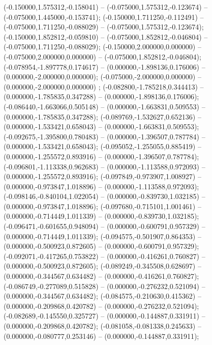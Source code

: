  (-0.150000,1.575312,-0.158041) -- (-0.075000,1.575312,-0.123674) -- (-0.075000,1.445000,-0.153741);
 (-0.150000,1.711250,-0.112491) -- (-0.075000,1.711250,-0.088029) -- (-0.075000,1.575312,-0.123674);
 (-0.150000,1.852812,-0.059810) -- (-0.075000,1.852812,-0.046804) -- (-0.075000,1.711250,-0.088029);
 (-0.150000,2.000000,0.000000) -- (-0.075000,2.000000,0.000000) -- (-0.075000,1.852812,-0.046804);
 (-0.078954,-1.897778,0.174617) -- (0.000000,-1.898136,0.176006) -- (0.000000,-2.000000,0.000000);
 (-0.075000,-2.000000,0.000000) -- (0.000000,-2.000000,0.000000) ;
 (-0.082800,-1.785218,0.344413) -- (0.000000,-1.785835,0.347288) -- (0.000000,-1.898136,0.176006);
 (-0.086440,-1.663066,0.505148) -- (0.000000,-1.663831,0.509553) -- (0.000000,-1.785835,0.347288);
 (-0.089769,-1.532627,0.652136) -- (0.000000,-1.533421,0.658043) -- (0.000000,-1.663831,0.509553);
 (-0.092675,-1.395800,0.780483) -- (0.000000,-1.396507,0.787784) -- (0.000000,-1.533421,0.658043);
 (-0.095052,-1.255055,0.885419) -- (0.000000,-1.255572,0.893916) -- (0.000000,-1.396507,0.787784);
 (-0.096801,-1.113338,0.962683) -- (0.000000,-1.113588,0.972093) -- (0.000000,-1.255572,0.893916);
 (-0.097849,-0.973907,1.008927) -- (0.000000,-0.973847,1.018896) -- (0.000000,-1.113588,0.972093);
 (-0.098146,-0.840104,1.022054) -- (0.000000,-0.839730,1.032185) -- (0.000000,-0.973847,1.018896);
 (-0.097680,-0.715101,1.001461) -- (0.000000,-0.714449,1.011339) -- (0.000000,-0.839730,1.032185);
 (-0.096471,-0.601655,0.948094) -- (0.000000,-0.600791,0.957329) -- (0.000000,-0.714449,1.011339);
 (-0.094575,-0.501907,0.864353) -- (0.000000,-0.500923,0.872605) -- (0.000000,-0.600791,0.957329);
 (-0.092071,-0.417265,0.753822) -- (0.000000,-0.416261,0.760827) -- (0.000000,-0.500923,0.872605);
 (-0.089249,-0.345508,0.628697) -- (0.000000,-0.344567,0.634482) -- (0.000000,-0.416261,0.760827);
 (-0.086749,-0.277089,0.515828) -- (0.000000,-0.276232,0.521094) -- (0.000000,-0.344567,0.634482);
 (-0.084575,-0.210630,0.415362) -- (0.000000,-0.209868,0.420782) -- (0.000000,-0.276232,0.521094);
 (-0.082689,-0.145550,0.325727) -- (0.000000,-0.144887,0.331911) -- (0.000000,-0.209868,0.420782);
 (-0.081058,-0.081338,0.245633) -- (0.000000,-0.080777,0.253146) -- (0.000000,-0.144887,0.331911);
